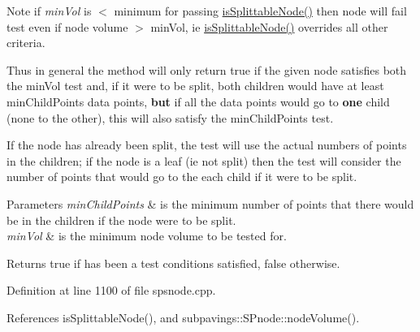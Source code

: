 \begin{DoxyNote}{\-Note}
if {\itshape min\-Vol\/} is $<$ minimum for passing \hyperlink{classsubpavings_1_1SPSnode_afcaf3b298a975017982e88a068bab8af}{is\-Splittable\-Node()} then node will fail test even if node volume $>$ min\-Vol, ie \hyperlink{classsubpavings_1_1SPSnode_afcaf3b298a975017982e88a068bab8af}{is\-Splittable\-Node()} overrides all other criteria.
\end{DoxyNote}
\-Thus in general the method will only return true if the given node satisfies both the min\-Vol test and, if it were to be split, both children would have at least min\-Child\-Points data points, {\bfseries but} if all the data points would go to {\bfseries one} child (none to the other), this will also satisfy the min\-Child\-Points test.

\-If the node has already been split, the test will use the actual numbers of points in the children; if the node is a leaf (ie not split) then the test will consider the number of points that would go to the each child if it were to be split.


\begin{DoxyParams}{\-Parameters}
{\em min\-Child\-Points} & is the minimum number of points that there would be in the children if the node were to be split. \\
\hline
{\em min\-Vol} & is the minimum node volume to be tested for. \\
\hline
\end{DoxyParams}
\begin{DoxyReturn}{\-Returns}
true if has been a test conditions satisfied, false otherwise. 
\end{DoxyReturn}


\-Definition at line 1100 of file spsnode.\-cpp.



\-References is\-Splittable\-Node(), and subpavings\-::\-S\-Pnode\-::node\-Volume().


